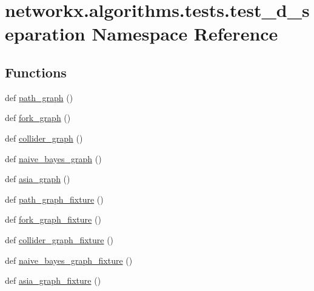 \hypertarget{namespacenetworkx_1_1algorithms_1_1tests_1_1test__d__separation}{}\section{networkx.\+algorithms.\+tests.\+test\+\_\+d\+\_\+separation Namespace Reference}
\label{namespacenetworkx_1_1algorithms_1_1tests_1_1test__d__separation}
\subsection*{Functions}
\begin{DoxyCompactItemize}
\item 
def \hyperlink{namespacenetworkx_1_1algorithms_1_1tests_1_1test__d__separation_a075d619883a3ab4077094ac9cfa7bad5}{path\+\_\+graph} ()
\item 
def \hyperlink{namespacenetworkx_1_1algorithms_1_1tests_1_1test__d__separation_a2eb3ca8186f69a87468aa9074675ea1a}{fork\+\_\+graph} ()
\item 
def \hyperlink{namespacenetworkx_1_1algorithms_1_1tests_1_1test__d__separation_a26219c50858bffbe710cabb60441b393}{collider\+\_\+graph} ()
\item 
def \hyperlink{namespacenetworkx_1_1algorithms_1_1tests_1_1test__d__separation_ad129dc144a4f24f3117d2a518e263a94}{naive\+\_\+bayes\+\_\+graph} ()
\item 
def \hyperlink{namespacenetworkx_1_1algorithms_1_1tests_1_1test__d__separation_a80e559b90cee9c13656566554b4835ad}{asia\+\_\+graph} ()
\item 
def \hyperlink{namespacenetworkx_1_1algorithms_1_1tests_1_1test__d__separation_a47bd52b0a6fcc26c39adffec6f50ada1}{path\+\_\+graph\+\_\+fixture} ()
\item 
def \hyperlink{namespacenetworkx_1_1algorithms_1_1tests_1_1test__d__separation_abab9691b10b08a6582b605c9777f5735}{fork\+\_\+graph\+\_\+fixture} ()
\item 
def \hyperlink{namespacenetworkx_1_1algorithms_1_1tests_1_1test__d__separation_a25f44af31875641c0dcfc6325c081d30}{collider\+\_\+graph\+\_\+fixture} ()
\item 
def \hyperlink{namespacenetworkx_1_1algorithms_1_1tests_1_1test__d__separation_aa99844ef08ca40a2e92f8dbd2106643a}{naive\+\_\+bayes\+\_\+graph\+\_\+fixture} ()
\item 
def \hyperlink{namespacenetworkx_1_1algorithms_1_1tests_1_1test__d__separation_ae3c87eabe335ee52ef6012eb3c15bc5f}{asia\+\_\+graph\+\_\+fixture} ()

\end{DoxyCompactItemize}
